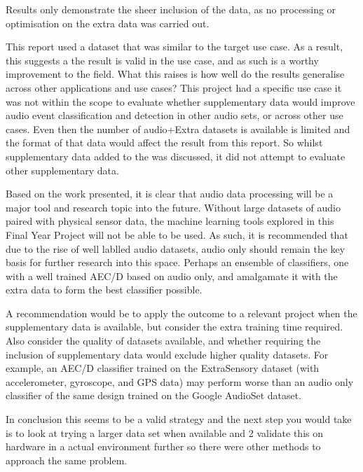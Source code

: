 \documentclass{UoNMCHA}
\numberwithin{equation}{section}
\begin{document}
Results only demonstrate the sheer inclusion of the data, as no processing or optimisation on the extra data was carried out.

This report used a dataset that was similar to the target use case. As a result, this suggests a the result is valid in the use case, and as such is a worthy improvement to the field.
What this raises is how well do the results generalise across other applications and use cases? This project had a specific use case it was not within the scope to evaluate whether supplementary data would improve audio event classification and detection in other audio sets, or across other use cases. Even then the number of audio+Extra datasets is available is limited and the format of that data would affect the result from this report. So whilst supplementary data added to the was discussed, it did not attempt to evaluate other supplementary data.

Based on the work presented, it is clear that audio data processing will be a major tool and research topic into the future. Without large datasets of audio paired with physical sensor data, the machine learning tools explored in this Final Year Project will not be able to be used. As such, it is recommended that due to the rise of well lablled audio datasets, audio only should remain the key basis for further research into this space. Perhaps an ensemble of classifiers, one with a well trained AEC/D based on audio only, and amalgamate it with the extra data to form the best classifier possible.

A recommendation would be to apply the outcome to a relevant project when the supplementary data is available, but consider the extra training time required. Also consider the quality of datasets available, and whether requiring the inclusion of supplementary data would exclude higher quality datasets. For example, an AEC/D classifier trained on the ExtraSensory dataset (with accelerometer, gyroscope, and GPS data) may perform worse than an audio only classifier of the same design trained on the Google AudioSet dataset.

In conclusion this seems to be a valid strategy and the next step you would take is to look at trying a larger data set when available and 2 validate this on hardware in a actual environment further so there were other methods to approach the same problem.

\end{document}
